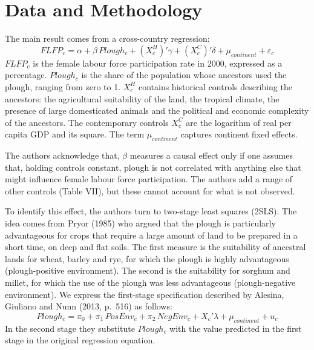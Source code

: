 \documentclass[11pt,a4paper]{article}
\newif\ifshowinstr
\newcommand{\instr}[1]{\ifshowinstr{\leavevmode\color{gray}\itshape\small [#1]\par}\fi}
\begin{document}
\section{Data and Methodology}
\instr{Think about what you need to explain the identification strategy of the authors and why they believe that it is valid. Appendix~B.1 summarizes the main points for OLS, panel data and IV designs. You can use these as a reference.}

The main result comes from a cross-country regression:
\begin{equation}\label{eq:ols}
  FLFP_c = \alpha + \beta\, Plough_c + (X_c^{H})'\gamma + (X_c^{C})'\delta + \mu_{continent} + \varepsilon_c
\end{equation}
$FLFP_c$ is the female labour force participation rate in 2000, expressed as a percentage. $Plough_c$ is the share of the population whose ancestors used the plough, ranging from zero to 1. $X_c^{H}$ contains historical controls describing the ancestors: the agricultural suitability of the land, the tropical climate, the presence of large domesticated animals and the political and economic complexity of the ancestors. The contemporary controls $X_c^{C}$ are the logarithm of real per capita GDP and its square. The term $\mu_{continent}$ captures continent fixed effects.

The authors acknowledge that, $\beta$ measures a causal effect only if one assumes that, holding controls constant, plough is not correlated with anything else that might influence female labour force participation. The authors add a range of other controls (Table VII), but these cannot account for what is not observed.

To identify this effect, the authors turn to two-stage least squares (2SLS). The idea comes from Pryor (1985) who argued that the plough is particularly advantageous for crops that require a large amount of land to be prepared in a short time, on deep and flat soils. The first measure is the suitability of ancestral lands for wheat, barley and rye, for which the plough is highly advantageous (plough-positive environment). The second is the suitability for sorghum and millet, for which the use of the plough was less advantageous (plough-negative environment). We express the first-stage specification described by Alesina, Giuliano and Nunn (2013, p.~516) as follows:
\begin{equation}\label{eq:firststage}
  Plough_c = \pi_0 + \pi_1\, PosEnv_c + \pi_2\, NegEnv_c + X_c'\lambda + \mu_{continent} + u_c
\end{equation}
In the second stage they substitute $Plough_c$ with the value predicted in the first stage in the original regression equation.
\end{document}
